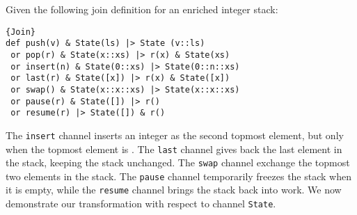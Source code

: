 \documentclass{LMCS}
\let \lst \lstinline
\renewcommand{\_}{\mathord{\rule[-.25ex]{1ex}{.15ex}}}
\begin{document}
Given the following join definition for an enriched integer stack:
\begin{lstlisting}{Join}
def push(v) & State(ls) |> State (v::ls) 
 or pop(r) & State(x::xs) |> r(x) & State(xs)
 or insert(n) & State(0::xs) |> State(0::n::xs)
 or last(r) & State([x]) |> r(x) & State([x])
 or swap() & State(x::x::xs) |> State(x::x::xs)
 or pause(r) & State([]) |> r()
 or resume(r) |> State([]) & r()
\end{lstlisting}
The \lst"insert" channel inserts an integer as the second topmost
element, but only when the topmost element is . The \lst"last"
channel gives back the last element in the stack, keeping the stack
unchanged.  The \lst"swap" channel exchange the topmost two elements
in the stack.  The \lst"pause" channel temporarily freezes the stack
when it is empty, while the \lst"resume" channel brings the stack back
into work.  We now demonstrate our transformation with respect to channel
\lst"State".
\def\one{1}
\def\two{2}
\def\three{3}
\def\four{4}
\def\five{5}
\def\six{6}
\def\seven{7}
\def\eight{8}
\end{document}
